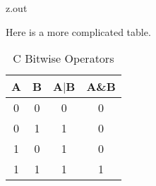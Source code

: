 \MyIO


\begin{VerbatimOut}{z.out}

\newpage

Here is a more complicated table.

{
  \UndefineShortVerb{\|}
\begin{table}[ht]
  \caption{C Bitwise Operators}
  \vspace*{6pt}
  \centering
    \begin{tabular}{@{}cccc@{}}
      \toprule
      \bf A& \bf B& \bf A\(|\)B& \bf A\&B\\[2pt]
      \midrule
      0& 0& 0& 0\\
      0& 1& 1& 0\\
      1& 0& 1& 0\\
      1& 1& 1& 1\\
      \bottomrule
    \end{tabular}
  \label{ta:C-Bitwise}
\end{table}
}
\end{VerbatimOut}

\MyIO


% 
% 
% 
% 


